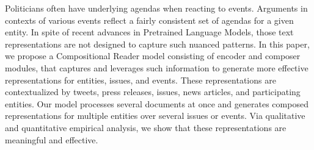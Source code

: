Politicians often have underlying agendas when reacting to events. Arguments in contexts of various events reflect a fairly consistent set of agendas for a given entity. In spite of recent advances in Pretrained Language Models, those text representations are not designed to capture such nuanced patterns. In this paper, we propose a Compositional Reader model consisting of encoder and composer modules, that captures and leverages such information to generate more effective representations for entities, issues, and events. These representations are contextualized by tweets, press releases, issues, news articles, and participating entities. Our model processes several documents at once and generates composed representations for multiple entities over several issues or events. Via qualitative and quantitative empirical analysis, we show that these representations are meaningful and effective.
